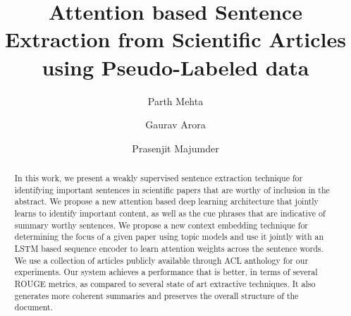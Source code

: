 \documentclass[sigconf]{acmart}
\begin{document}
\title{Attention based Sentence Extraction from Scientific Articles using Pseudo-Labeled data}


\author{Parth Mehta}


\author{Gaurav Arora}

\author{Prasenjit Majumder}


\begin{abstract}
In this work, we present a weakly supervised sentence extraction technique for identifying important sentences in scientific papers that are worthy of inclusion in the abstract. We propose a new attention based deep learning architecture that jointly learns to identify important content, as well as the cue phrases that are indicative of summary worthy sentences. We propose a new context embedding technique for determining the focus of a given paper using topic models and use it jointly with an LSTM based sequence encoder to learn attention weights across the sentence words. We use a collection of articles publicly available through ACL anthology for our experiments. Our system achieves a performance that is better, in terms of several ROUGE metrics, as compared to several state of art extractive techniques. It also generates more coherent summaries and preserves the overall structure of the document.
\end{abstract}

%
%



\maketitle





\end{document}
